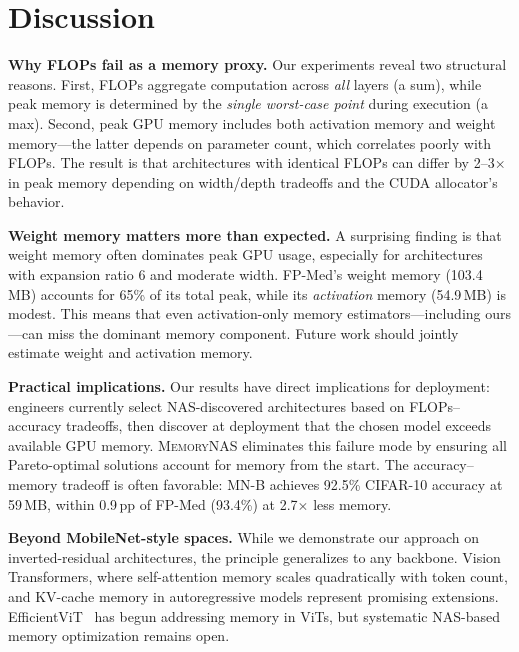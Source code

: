 \documentclass[10pt,twocolumn,letterpaper]{article}
\newcommand{\ours}{\textsc{MemoryNAS}}
\begin{document}
\section{Discussion}
\label{sec:discussion}

\textbf{Why FLOPs fail as a memory proxy.} Our experiments reveal two structural reasons. First, FLOPs aggregate computation across \emph{all} layers (a sum), while peak memory is determined by the \emph{single worst-case point} during execution (a max). Second, peak GPU memory includes both activation memory and weight memory---the latter depends on parameter count, which correlates poorly with FLOPs. The result is that architectures with identical FLOPs can differ by 2--3$\times$ in peak memory depending on width/depth tradeoffs and the CUDA allocator's behavior.

\textbf{Weight memory matters more than expected.} A surprising finding is that weight memory often dominates peak GPU usage, especially for architectures with expansion ratio 6 and moderate width. FP-Med's weight memory (103.4\,MB) accounts for 65\% of its total peak, while its \emph{activation} memory (54.9\,MB) is modest. This means that even activation-only memory estimators---including ours---can miss the dominant memory component. Future work should jointly estimate weight and activation memory.

\textbf{Practical implications.} Our results have direct implications for deployment: engineers currently select NAS-discovered architectures based on FLOPs--accuracy tradeoffs, then discover at deployment that the chosen model exceeds available GPU memory. \ours{} eliminates this failure mode by ensuring all Pareto-optimal solutions account for memory from the start. The accuracy--memory tradeoff is often favorable: MN-B achieves 92.5\% CIFAR-10 accuracy at 59\,MB, within 0.9\,pp of FP-Med (93.4\%) at 2.7$\times$ less memory.

\textbf{Beyond MobileNet-style spaces.} While we demonstrate our approach on inverted-residual architectures, the principle generalizes to any backbone. Vision Transformers, where self-attention memory scales quadratically with token count, and KV-cache memory in autoregressive models represent promising extensions. EfficientViT~\cite{liu2023efficientvit} has begun addressing memory in ViTs, but systematic NAS-based memory optimization remains open.
\end{document}

